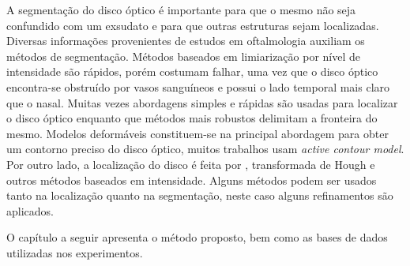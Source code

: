 A segmentação do disco óptico é importante para que o mesmo não seja confundido com um exsudato e para que outras estruturas sejam localizadas. Diversas informações provenientes de estudos em oftalmologia auxiliam os métodos de segmentação. Métodos baseados em limiarização por nível de intensidade são rápidos, porém costumam falhar, uma vez que o disco óptico encontra-se obstruído por vasos sanguíneos e possui o lado temporal mais claro que o nasal. Muitas vezes abordagens simples e rápidas são usadas para localizar o disco óptico enquanto que métodos mais robustos delimitam a fronteira do mesmo. Modelos deformáveis constituem-se na principal abordagem para obter um contorno preciso do disco óptico, muitos trabalhos usam \textit{active contour model}. Por outro lado, a localização do disco é feita por , transformada de Hough e outros métodos baseados em intensidade. Alguns métodos podem ser usados tanto na localização quanto na segmentação, neste caso alguns refinamentos são aplicados.  

O capítulo a seguir apresenta o método proposto, bem como as bases de dados utilizadas nos experimentos.

